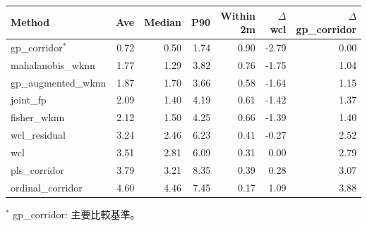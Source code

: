 \begin{tabular}{lrrrrrr}
\toprule
Method & Ave & Median & P90 & Within 2m & $\Delta$wcl & $\Delta$gp\_corridor \\
\midrule
gp\_corridor$^{\ast}$ & 0.72 & 0.50 & 1.74 & 0.90 & -2.79 & 0.00 \\
mahalanobis\_wknn & 1.77 & 1.29 & 3.82 & 0.76 & -1.75 & 1.04 \\
gp\_augmented\_wknn & 1.87 & 1.70 & 3.66 & 0.58 & -1.64 & 1.15 \\
joint\_fp & 2.09 & 1.40 & 4.19 & 0.61 & -1.42 & 1.37 \\
fisher\_wknn & 2.12 & 1.50 & 4.25 & 0.66 & -1.39 & 1.40 \\
wcl\_residual & 3.24 & 2.46 & 6.23 & 0.41 & -0.27 & 2.52 \\
wcl & 3.51 & 2.81 & 6.09 & 0.31 & 0.00 & 2.79 \\
pls\_corridor & 3.79 & 3.21 & 8.35 & 0.39 & 0.28 & 3.07 \\
ordinal\_corridor & 4.60 & 4.46 & 7.45 & 0.17 & 1.09 & 3.88 \\
\bottomrule
\end{tabular}
\par\footnotesize $^{\ast}$ gp\_corridor: 主要比較基準。
